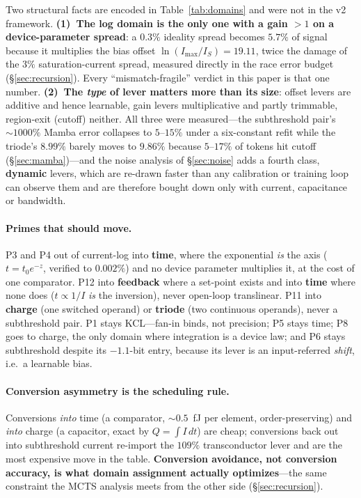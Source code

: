 \documentclass[11pt]{article}
\begin{document}
Two structural facts are encoded in Table~\ref{tab:domains} and were not in the v2 framework. \textbf{(1)~The log domain is the only one with a gain $>1$ on a device-parameter spread}: a $0.3\%$ ideality spread becomes $5.7\%$ of signal because it multiplies the bias offset $\ln(I_{\max}/I_S) = 19.11$, twice the damage of the $3\%$ saturation-current spread, measured directly in the race error budget (\S\ref{sec:recursion}). Every ``mismatch-fragile'' verdict in this paper is that one number. \textbf{(2)~The \textit{type} of lever matters more than its size}: offset levers are additive and hence learnable, gain levers multiplicative and partly trimmable, region-exit (cutoff) neither. All three were measured---the subthreshold pair's ${\sim}1000\%$ Mamba error collapses to $5$--$15\%$ under a six-constant refit while the triode's $8.99\%$ barely moves to $9.86\%$ because $5$--$17\%$ of tokens hit cutoff (\S\ref{sec:mamba})---and the noise analysis of \S\ref{sec:noise} adds a fourth class, \textbf{dynamic} levers, which are re-drawn faster than any calibration or training loop can observe them and are therefore bought down only with current, capacitance or bandwidth.

\paragraph{Primes that should move.} P3 and P4 out of current-log into \textbf{time}, where the exponential \textit{is} the axis ($t = t_0e^{-z}$, verified to $0.002\%$) and no device parameter multiplies it, at the cost of one comparator. P12 into \textbf{feedback} where a set-point exists and into \textbf{time} where none does ($t\propto1/I$ \textit{is} the inversion), never open-loop translinear. P11 into \textbf{charge} (one switched operand) or \textbf{triode} (two continuous operands), never a subthreshold pair. P1 stays KCL---fan-in binds, not precision; P5 stays time; P8 goes to charge, the only domain where integration is a device law; and P6 stays subthreshold despite its $-1.1$-bit entry, because its lever is an input-referred \textit{shift}, i.e.\ a learnable bias.

\paragraph{Conversion asymmetry is the scheduling rule.} Conversions \textit{into} time (a comparator, ${\sim}0.5$~fJ per element, order-preserving) and \textit{into} charge (a capacitor, exact by $Q = \int I\,dt$) are cheap; conversions back out into subthreshold current re-import the $109\%$ transconductor lever and are the most expensive move in the table. \textbf{Conversion avoidance, not conversion accuracy, is what domain assignment actually optimizes}---the same constraint the MCTS analysis meets from the other side (\S\ref{sec:recursion}).
\end{document}
